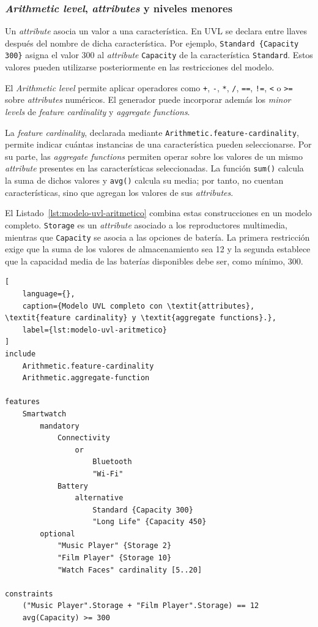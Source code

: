 \subsubsection{\textit{Arithmetic level}, \textit{attributes} y niveles menores}

Un \textit{attribute} asocia un valor a una característica. En UVL se declara
entre llaves después del nombre de dicha característica. Por ejemplo,
\texttt{Standard \{Capacity 300\}} asigna el valor 300 al \textit{attribute}
\texttt{Capacity} de la característica \texttt{Standard}. Estos valores pueden
utilizarse posteriormente en las restricciones del modelo.

El \textit{Arithmetic level} permite aplicar operadores como \texttt{+},
\texttt{-}, \texttt{*}, \texttt{/}, \texttt{==}, \texttt{!=}, \texttt{<} o
\texttt{>=} sobre \textit{attributes} numéricos. El generador puede incorporar
además los \textit{minor levels} de \textit{feature cardinality} y
\textit{aggregate functions}.

La \textit{feature cardinality}, declarada mediante
\texttt{Arithmetic.feature-cardinality}, permite indicar cuántas instancias de
una característica pueden seleccionarse. Por su parte, las
\textit{aggregate functions} permiten operar sobre los valores de un mismo
\textit{attribute} presentes en las características seleccionadas. La función
\texttt{sum()} calcula la suma de dichos valores y \texttt{avg()} calcula su
media; por tanto, no cuentan características, sino que agregan los valores de
sus \textit{attributes}.

El Listado~\ref{lst:modelo-uvl-aritmetico} combina estas construcciones en un
modelo completo. \texttt{Storage} es un \textit{attribute} asociado a los
reproductores multimedia, mientras que \texttt{Capacity} se asocia a las
opciones de batería. La primera restricción exige que la suma de los valores de
almacenamiento sea 12 y la segunda establece que la capacidad media de las
baterías disponibles debe ser, como mínimo, 300.

\begin{lstlisting}[
    language={},
    caption={Modelo UVL completo con \textit{attributes}, \textit{feature cardinality} y \textit{aggregate functions}.},
    label={lst:modelo-uvl-aritmetico}
]
include
    Arithmetic.feature-cardinality
    Arithmetic.aggregate-function

features
    Smartwatch
        mandatory
            Connectivity
                or
                    Bluetooth
                    "Wi-Fi"
            Battery
                alternative
                    Standard {Capacity 300}
                    "Long Life" {Capacity 450}
        optional
            "Music Player" {Storage 2}
            "Film Player" {Storage 10}
            "Watch Faces" cardinality [5..20]

constraints
    ("Music Player".Storage + "Film Player".Storage) == 12
    avg(Capacity) >= 300
\end{lstlisting}

